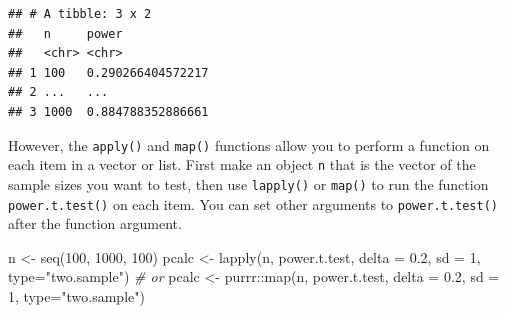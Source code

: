 \documentclass[
  oneside]{book}
\newenvironment{Shaded}{\begin{snugshade}}{\end{snugshade}}
\newcommand{\AttributeTok}[1]{\textcolor[rgb]{0.77,0.63,0.00}{#1}}
\newcommand{\CommentTok}[1]{\textcolor[rgb]{0.56,0.35,0.01}{\textit{#1}}}
\newcommand{\DecValTok}[1]{\textcolor[rgb]{0.00,0.00,0.81}{#1}}
\newcommand{\FloatTok}[1]{\textcolor[rgb]{0.00,0.00,0.81}{#1}}
\newcommand{\FunctionTok}[1]{\textcolor[rgb]{0.00,0.00,0.00}{#1}}
\newcommand{\NormalTok}[1]{#1}
\newcommand{\OtherTok}[1]{\textcolor[rgb]{0.56,0.35,0.01}{#1}}
\newcommand{\SpecialCharTok}[1]{\textcolor[rgb]{0.00,0.00,0.00}{#1}}
\newcommand{\StringTok}[1]{\textcolor[rgb]{0.31,0.60,0.02}{#1}}
\begin{document}
\begin{Shaded}
\end{Shaded}

\begin{verbatim}
## # A tibble: 3 x 2
##   n     power            
##   <chr> <chr>            
## 1 100   0.290266404572217
## 2 ...   ...              
## 3 1000  0.884788352886661
\end{verbatim}

However, the \texttt{apply()} and \texttt{map()} functions allow you to perform a function on each item in a vector or list. First make an object \texttt{n} that is the vector of the sample sizes you want to test, then use \texttt{lapply()} or \texttt{map()} to run the function \texttt{power.t.test()} on each item. You can set other arguments to \texttt{power.t.test()} after the function argument.

\begin{Shaded}
\begin{Highlighting}[]
\NormalTok{n }\OtherTok{\textless{}{-}} \FunctionTok{seq}\NormalTok{(}\DecValTok{100}\NormalTok{, }\DecValTok{1000}\NormalTok{, }\DecValTok{100}\NormalTok{)}
\NormalTok{pcalc }\OtherTok{\textless{}{-}} \FunctionTok{lapply}\NormalTok{(n, power.t.test, }
                \AttributeTok{delta =} \FloatTok{0.2}\NormalTok{, }\AttributeTok{sd =} \DecValTok{1}\NormalTok{, }\AttributeTok{type=}\StringTok{"two.sample"}\NormalTok{)}
\CommentTok{\# or}
\NormalTok{pcalc }\OtherTok{\textless{}{-}}\NormalTok{ purrr}\SpecialCharTok{::}\FunctionTok{map}\NormalTok{(n, power.t.test, }
                \AttributeTok{delta =} \FloatTok{0.2}\NormalTok{, }\AttributeTok{sd =} \DecValTok{1}\NormalTok{, }\AttributeTok{type=}\StringTok{"two.sample"}\NormalTok{)}
\end{Highlighting}
\end{Shaded}
\end{document}
